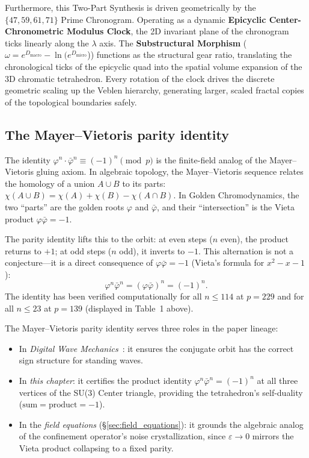 Furthermore, this Two-Part Synthesis is driven geometrically by the $\{47, 59, 61, 71\}$ Prime Chronogram. Operating as a dynamic \textbf{Epicyclic Center-Chronometric Modulus Clock}, the 2D invariant plane of the chronogram ticks linearly along the $\lambda$ axis. The \textbf{Substructural Morphism} ($\omega = e^{D_{\text{macro}}} - \ln(e^{D_{\text{micro}}}$)) functions as the structural gear ratio, translating the chronological ticks of the epicyclic quad into the spatial volume expansion of the 3D chromatic tetrahedron. Every rotation of the clock drives the discrete geometric scaling up the Veblen hierarchy, generating larger, scaled fractal copies of the topological boundaries safely.

\subsection{The Mayer--Vietoris parity identity}
\label{sec:mv_parity}

The identity $\varphi^n \cdot \bar\varphi^n \equiv (-1)^n \pmod{p}$
is the finite-field analog of the Mayer--Vietoris gluing axiom.
In algebraic topology, the Mayer--Vietoris sequence relates the
homology of a union $A \cup B$ to its parts:
$\chi(A \cup B) = \chi(A) + \chi(B) - \chi(A \cap B)$.
In Golden Chromodynamics, the two ``parts'' are the golden roots
$\varphi$ and $\bar\varphi$, and their ``intersection'' is the
Vieta product $\varphi \bar\varphi = -1$.

The parity identity lifts this to the orbit:
at even steps ($n$ even), the product returns to $+1$;
at odd steps ($n$ odd), it inverts to $-1$.
This alternation is not a conjecture---it is a direct consequence
of $\varphi \bar\varphi = -1$ (Vieta's formula for $x^2 - x - 1$):
\[
\varphi^n \bar\varphi^n = (\varphi \bar\varphi)^n = (-1)^n.
\]
The identity has been verified computationally for all $n \leq 114$
at $p = 229$ and for all $n \leq 23$ at $p = 139$
(displayed in Table~1 above).

The Mayer--Vietoris parity identity serves three roles in the
paper lineage:
\begin{itemize}
\item In \emph{Digital Wave Mechanics}~\cite{lockwood_larue_dwm, dwm}: it ensures the
  conjugate orbit has the correct sign structure for standing waves.
\item In \emph{this chapter}: it certifies the product identity
  $\varphi^n \bar\varphi^n = (-1)^n$ at all three vertices of the
  SU(3) Center triangle, providing the tetrahedron's
  self-duality ($\text{sum} = \text{product} = -1$).
\item In the \emph{field equations} (\S\ref{sec:field_equations}):
  it grounds the algebraic analog of the confinement operator's noise
  crystallization, since $\varepsilon \to 0$ mirrors the Vieta product
  collapsing to a fixed parity.
\end{itemize}


